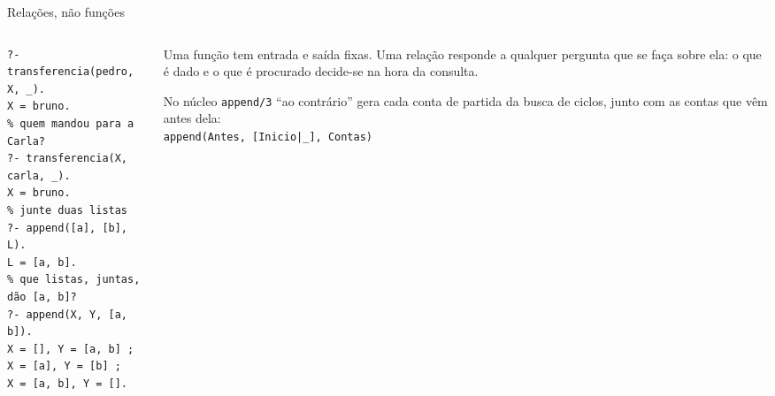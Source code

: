 \documentclass[aspectratio=169,11pt,xcolor=table]{beamer}
\begin{document}
\begin{frame}[fragile]{Relações, não funções}
  \begin{columns}[T]
    \begin{column}{0.50\textwidth}
\begin{lstlisting}[style=pl, style=pequeno]
% para quem o Pedro mandou?
?- transferencia(pedro, X, _).
X = bruno.
% quem mandou para a Carla?
?- transferencia(X, carla, _).
X = bruno.
% junte duas listas
?- append([a], [b], L).
L = [a, b].
% que listas, juntas, dão [a, b]?
?- append(X, Y, [a, b]).
X = [], Y = [a, b] ;
X = [a], Y = [b] ;
X = [a, b], Y = [].
\end{lstlisting}
    \end{column}
    \begin{column}{0.46\textwidth}
      \small
      Uma função tem entrada e saída fixas. Uma \alert{relação} responde a
      qualquer pergunta que se faça sobre ela: o que é dado e o que é
      procurado decide-se na hora da consulta.
      \vspace{8pt}

      \begin{block}{No núcleo}
        \footnotesize
        \texttt{append/3} ``ao contrário'' gera cada conta de partida da busca
        de ciclos, junto com as contas que vêm antes dela:\\[3pt]
        \texttt{append(Antes, [Inicio|\_], Contas)}
      \end{block}
    \end{column}
  \end{columns}
\end{frame}
\end{document}
